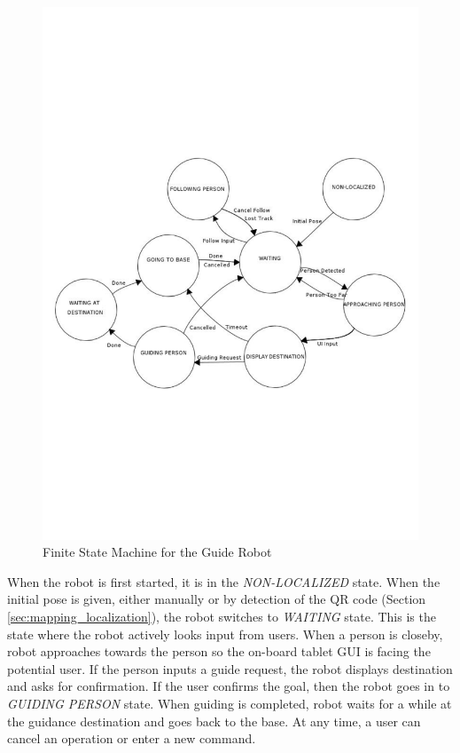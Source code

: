 \begin{figure}[ht!]
\centering
\includegraphics[width=1.0\textwidth]{pics/fsm}
\caption{Finite State Machine for the Guide Robot}
\label{fig:fsm}
\end{figure}

When the robot is first started, it is in the \textit{NON-LOCALIZED} state. When the initial pose is given, either manually or by detection of the QR code (Section \ref{sec:mapping_localization}), the robot switches to \textit{WAITING} state. This is the state where the robot actively looks input from users. When a person is closeby, robot approaches towards the person so the on-board tablet GUI is facing the potential user. If the person inputs a guide request, the robot displays destination and asks for confirmation. If the user confirms the goal, then the robot goes in to \textit{GUIDING PERSON} state. When guiding is completed, robot waits for a while at the guidance destination and goes back to the base. At any time, a user can cancel an operation or enter a new command.

